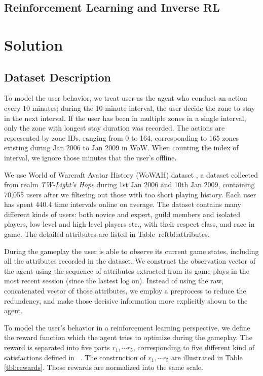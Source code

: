 \documentclass[a4paper]{article}
\begin{document}
\subsection{Reinforcement Learning and Inverse RL}



\section{Solution}

\subsection{Dataset Description}

To model the user behavior, we treat user as the agent who conduct an action every 10 minutes; during the 10-minute interval, the user decide the zone to stay in the next interval. If the user has been in multiple zones in a single interval, only the zone with longest stay duration was recorded. The actions are represented by zone IDs, ranging from 0 to 164, corresponding to 165 zones existing during Jan 2006 to Jan 2009 in WoW. When counting the index of interval, we ignore those minutes that the user's offline.

We use World of Warcraft Avatar History (WoWAH) dataset \cite{}, a dataset collected from realm \textit{TW-Light's Hope} during 1st Jan 2006 and 10th Jan 2009, containing 70,055 users after we filtering out those with too short playing history. Each user has spent 440.4 time intervals online on average. The dataset contains many different kinds of users: both novice and expert, guild members and isolated players, low-level and high-level players etc., with their respect class, and race in game. The detailed attributes are listed in Table~ref{tbl:attributes}.

During the gameplay the user is able to observe its current game states, including all the attributes recorded in the dataset. We construct the observation vector of the agent using the sequence of attributes extracted from its game plays in the most recent session (since the lastest log on). Instead of using the raw, concatenated vector of those attributes, we employ a preprocess to reduce the redundency, and make those decisive information more explicitly shown to the agent.

To model the user's behavior in a reinforcement learning perspective, we define the reward function which the agent tries to optimize during the gameplay. The reward is separated into five parts $r_1,\cdots r_5$, corresponding to five different kind of satisfactions defined in ~\cite{}. The construction of $r_1,\cdots r_5$ are illustrated in Table \ref{tbl:rewards}. Those rewards are normalized into the same scale.
\end{document}
